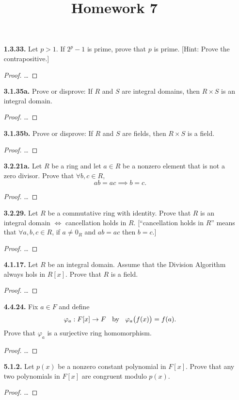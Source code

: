 \documentclass[12pt]{article}
\title{Homework 7}
\begin{document}
\begin{itemize}
\item[\textbf{ 1.3.33.}] Let $p>1$. If $2^p-1$ is prime, prove that $p$ is prime.
[Hint: Prove the contrapositive.]
\begin{proof}
	\dots
\end{proof}

\item[\textbf{3.1.35a.}] Prove or disprove: If $R$ and $S$ are integral domains, then $R\times S$ is an integral domain.
\begin{proof}
	\dots
\end{proof}

\item[\textbf{3.1.35b.}] Prove or disprove: If $R$ and $S$ are fields, then $R\times S$ is a field.
\begin{proof}
	\dots
\end{proof}

\item[\textbf{ 3.2.21a.}] Let $R$ be a ring and let $a\in R$ be a nonzero element that is not a zero divisor. Prove that $\forall b,c\in R$, \[ab=ac\implies b=c.\]
\begin{proof}
	\dots
\end{proof}

\item[\textbf{3.2.29.}] Let $R$ be a commutative ring with identity. Prove that $R$ is an integral domain $\iff$ cancellation holds in $R$.
[``cancellation holds in $R$'' means that $\forall  a,b,c\in R$, if $a\ne 0_R$ and $ab=ac$ then $b=c$.]
\begin{proof}
	\dots
\end{proof}

\item[\textbf{ 4.1.17.}] Let $R$ be an integral domain. Assume that the Division Algorithm always hols in $R[x]$. Prove that $R$ is a field.
\begin{proof}
	\dots
\end{proof}

\item[\textbf{ 4.4.24.}] Fix $a\in F$ and define \[\varphi_a : F[x]\to F \text{\;\; by \;\;} \varphi_a\bigl(f(x)\bigr) =f(a).\] Prove that $\varphi_a$ is a surjective ring homomorphism.
\begin{proof}
	\dots
\end{proof}

\item[\textbf{5.1.2.}] Let $p(x)$ be a nonzero constant polynomial in $F[x]$. Prove that any two polynomials in $F[x]$ are congruent modulo $p(x)$.
\begin{proof}
	\dots
\end{proof}


\end{itemize}
\end{document}
